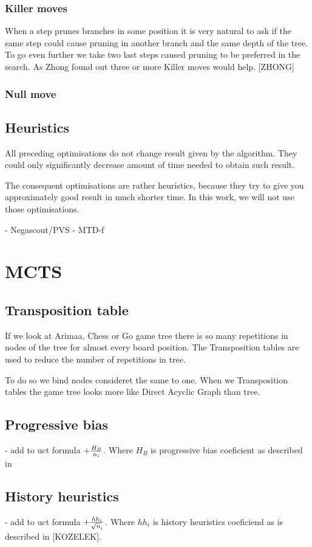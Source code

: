 \documentclass[12pt,titlepage,fleqn]{report}
\begin{document}
	\subsubsection{Killer moves}
	When a step prunes branches in some position it is very natural to ask if
	the same step could cause pruning in another branch and the same depth of
	the tree. To go even further we take two last steps caused pruning to be
	preferred in the search. As Zhong found out three or more Killer moves would help. [ZHONG]

	\subsubsection{Null move}

\subsection{Heuristics}
All preceding optimisations do not change result given by the algorithm. They
could only significantly decrease amount of time needed to obtain such result.

The consequent optimisations are rather heuristics, because they try to
give you approximately good result in much shorter time. In this work, we
will not use those optimisations.


- Negascout/PVS
- MTD-f


\section{MCTS}
\subsection{Transposition table}
If we look at Arimaa, Chess or Go game tree there is so many repetitions in
nodes of the tree for almost every board position. The Transposition tables
are used to reduce the number of repetitions in tree.

To do so we bind nodes consideret the same to one. When we Transposition
tables the game tree looks more like Direct Acyclic Graph than tree.

\subsection{Progressive bias}
- add to uct formula $+ {H_B \over n_i}$. Where $H_B$ is progressive bias
coeficient as described in 
\subsection{History heuristics}
- add to uct formula $+ {hh_i \over \sqrt n_i}$. Where $hh_i$ is history
heuristics coeficiend as is described in [KOZELEK].
\end{document}
